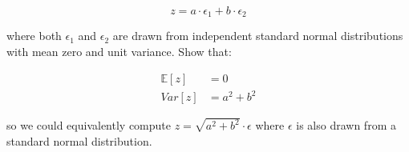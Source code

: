 \documentclass[
10pt, %
a4paper, %
oneside, %
headinclude,footinclude, %
BCOR5mm, %
]{scrartcl}
\begin{document}
$$z = a \cdot \epsilon_1 + b \cdot \epsilon_2$$

where both $\epsilon_1$ and $\epsilon_2$ are drawn from independent standard normal distributions with mean zero and unit variance. Show that:

\begin{align*}
  \mathbb{E}[z] &= 0 \\
  Var[z] &= a^2 + b^2
\end{align*}

so we could equivalently compute $z = \sqrt{a^2 + b^2} \cdot \epsilon$ where $\epsilon$ is also drawn from a standard normal distribution.


\end{document}
